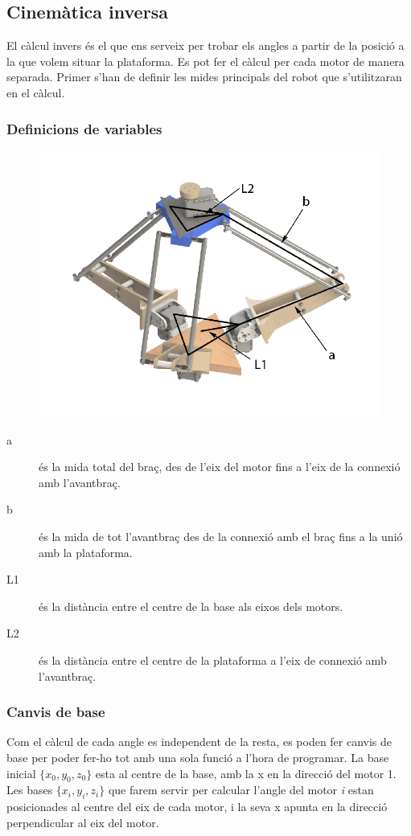 \subsection{Cinemàtica inversa}

El càlcul invers és el que ens serveix per trobar els angles a partir de la posició a la que volem situar la plataforma. Es pot fer el càlcul per cada motor de manera separada. Primer s'han de definir les mides principals del robot que s'utilitzaran en el càlcul.

\subsubsection{Definicions de variables}
\begin{figure}[h!]
\centering
\includegraphics[width=12cm]{./imgComp/esquema_general}
\end{figure}

\begin{description}
\item[a] és la mida total del braç, des de l'eix del motor fins a l'eix de la connexió amb l'avantbraç.
\item[b] és la mida de tot l'avantbraç des de la connexió amb el braç fins a la unió amb la plataforma.
\item[L1] és la distància entre el centre de la base als eixos dels motors.
\item[L2] és la distància entre el centre de la plataforma a l'eix de connexió amb l'avantbraç.
\end{description}

\subsubsection{Canvis de base}
Com el càlcul de cada angle es independent de la resta, es poden fer canvis de base per poder fer-ho tot amb una sola funció a l'hora de programar. La base inicial \(\{x_0,y_0,z_0\}\) esta al centre de la base, amb la x en la direcció del motor 1. Les bases \(\{x_i,y_i,z_i\}\) que farem servir per calcular l'angle del motor \emph{i} estan posicionades al centre del eix de cada motor, i la seva x apunta en la direcció perpendicular al eix del motor.


